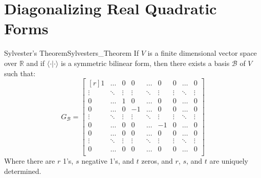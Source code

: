 \documentclass{article}                                                        %
\begin{document}
    \section{Diagonalizing Real Quadratic Forms}
        \begin{ltheorem}{Sylvester's Theorem}{Sylvesters_Theorem}
            If $V$ is a finite dimensional vector space over $\mathbb{R}$ and if
            $\langle\cdot|\cdot\rangle$ is a symmetric bilinear form, then there
            exists a basis $\mathscr{B}$ of $V$ such that:
            \begin{equation}
                G_{\mathscr{B}}=
                \begin{bmatrix*}[r]
                    1&\dots&0&0&\dots&0&0&\dots&0\\
                    \vdots&\ddots&\vdots&\vdots&\ddots
                        &\vdots&\vdots&\ddots&\vdots\\
                    0&\dots&1&0&\dots&0&0&\dots&0\\
                    0&\dots&0&\minus{1}&\dots&0&0&\dots&0\\
                    \vdots&\ddots&\vdots&\vdots
                        &\ddots&\vdots&\vdots&\ddots&\vdots\\
                    0&\dots&0&0&\dots&\minus{1}&0&\dots&0\\
                    0&\dots&0&0&\dots&0&0&\dots&0\\
                    \vdots&\ddots&\vdots&\vdots&\ddots
                        &\vdots&\vdots&\ddots&\vdots\\
                    0&\dots&0&0&\dots&0&0&\dots&0\\
                \end{bmatrix*}
            \end{equation}
            Where there are $r$ 1's, $s$ negative 1's, and $t$ zeros, and
            $r$, $s$, and $t$ are uniquely determined.
        \end{ltheorem}
\end{document}
